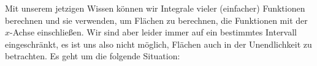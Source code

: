 \documentclass[../../main.tex]{subfiles}
\begin{document}
Mit unserem jetzigen Wissen können wir Integrale vieler (einfacher) Funktionen berechnen und sie verwenden, um Flächen 
zu berechnen, die Funktionen mit der $x$-Achse einschließen. Wir sind aber leider immer auf ein bestimmtes Intervall 
eingeschränkt, es ist uns also nicht möglich, Flächen auch in der Unendlichkeit zu betrachten. Es geht um die folgende 
Situation:
\begin{center}
\end{center}
\end{document}
